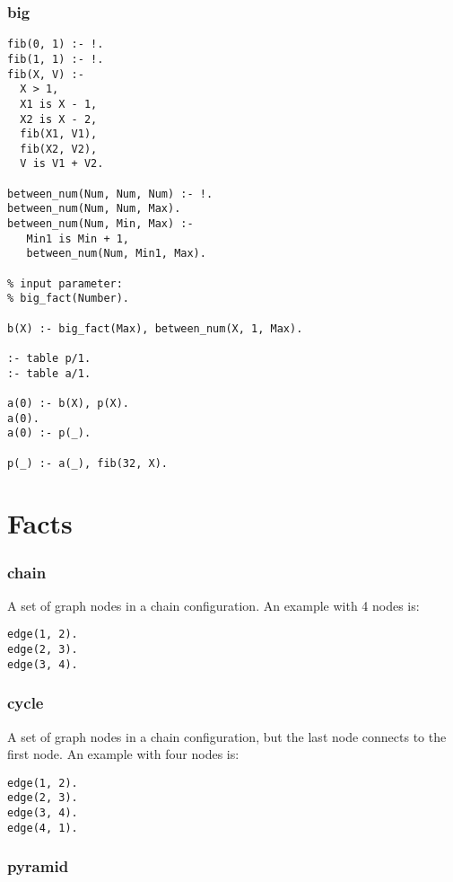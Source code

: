 \subsubsection*{big}

\begin{Verbatim}
fib(0, 1) :- !.
fib(1, 1) :- !.
fib(X, V) :-
  X > 1,
  X1 is X - 1,
  X2 is X - 2,
  fib(X1, V1),
  fib(X2, V2),
  V is V1 + V2.

between_num(Num, Num, Num) :- !.
between_num(Num, Num, Max).
between_num(Num, Min, Max) :-
   Min1 is Min + 1,
   between_num(Num, Min1, Max).

% input parameter:
% big_fact(Number).
   
b(X) :- big_fact(Max), between_num(X, 1, Max).

:- table p/1.
:- table a/1.

a(0) :- b(X), p(X).
a(0).
a(0) :- p(_).

p(_) :- a(_), fib(32, X).
\end{Verbatim}

\section{Facts}

\subsubsection*{chain}

A set of graph nodes in a chain configuration.
An example with 4 nodes is:

\begin{Verbatim}
edge(1, 2).
edge(2, 3).
edge(3, 4).
\end{Verbatim}

\subsubsection*{cycle}

A set of graph nodes in a chain configuration, but the last node connects to the first node.
An example with four nodes is:

\begin{Verbatim}
edge(1, 2).
edge(2, 3).
edge(3, 4).
edge(4, 1).
\end{Verbatim}

\subsubsection*{pyramid}

